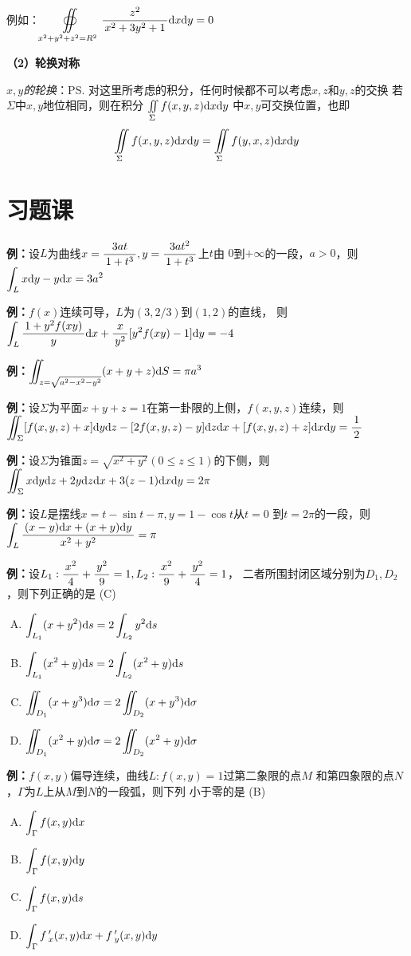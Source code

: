 例如：$\displaystyle\oiint\limits_{x^2+y^2+z^2=R^2}\displaystyle\frac{\,{z^2}\,}{\,{x^2+3y^2+1}\,}\mathrm{d} x\mathrm{d} y=0$

{\bf （2）轮换对称}

{\it\color{red} $x,y$的轮换}：\ps{\color{red}
对这里所考虑的积分，任何时候都不可以考虑$x,z$和$y,z$的交换}
{\color{red} 若$\Sigma$中$x,y$地位相同，则在积分
$\iint\limits_{\Sigma}f(x,y,z)\mathrm{d} x\mathrm{d} y$
中$x,y$可交换位置}，也即
$$\iint\limits_{\Sigma}f(x,y,z)\mathrm{d} x\mathrm{d} y=\iint\limits_{\Sigma}f(y, x,z)\mathrm{d} x\mathrm{d} y$$

\newpage

\section{习题课}

{\bf 例：}设$L$为曲线$x=\displaystyle\frac{\,{3at}\,}{\,{1+t^3}\,},y=\displaystyle\frac{\,{3at^2}\,}{\,{1+t^3}\,}$上$t$由
$0$到$+\infty$的一段，$a>0$，则$\displaystyle\int_Lx\mathrm{d} y-y\mathrm{d} x=3a^2$

{\bf 例：}$f(x)$连续可导，$L$为$(3,2/3)$到$(1,2)$的直线，
则$\displaystyle\int_L\displaystyle\frac{\,{1+y^2f(xy)}\,}{\,{y}\,}\mathrm{d} x+\displaystyle\frac{\,{x}\,}{\,{y^2}\,}[y^2f(xy)-1]\mathrm{d} y=-4$

{\bf 例：}$\displaystyle\iint_{z=\sqrt{a^2-x^2-y^2}}(x+y+z)\mathrm{d} S=\pi a^3$

{\bf 例：}设$\Sigma$为平面$x+y+z=1$在第一卦限的上侧，$f(x,y,z)$连续，则
$\displaystyle\iint_{\Sigma}[f(x,y,z)+x]\mathrm{d} y\mathrm{d} z-[2f(x,y,z)-y]\mathrm{d} z\mathrm{d} x+
[f(x,y,z)+z]\mathrm{d} x\mathrm{d} y=\displaystyle\frac{\,{1}\,}{\,{2}\,}$

{\bf 例：}设$\Sigma$为锥面$z=\sqrt{x^2+y^2}(0\leq z\leq 1)$的下侧，则
$\displaystyle\iint_{\Sigma}x\mathrm{d} y\mathrm{d} z+2y\mathrm{d} z\mathrm{d} x+3(z-1)\mathrm{d} x\mathrm{d} y=2\pi$

{\bf 例：}设$L$是摆线$x=t-\sin t-\pi,y=1-\cos t$从$t=0$
到$t=2\pi$的一段，则$\displaystyle\int_L\displaystyle\frac{\,{(x-y)\mathrm{d} x+(x+y)\mathrm{d} y}\,}{\,{x^2+y^2}\,}=\pi$

{\bf 例：}设$L_1:\displaystyle\frac{\,{x^2}\,}{\,{4}\,}+\displaystyle\frac{\,{y^2}\,}{\,{9}\,}=1,L_2:\displaystyle\frac{\,{x^2}\,}{\,{9}\,}+\displaystyle\frac{\,{y^2}\,}{\,{4}\,}=1$，
二者所围封闭区域分别为$D_1,D_2$，则下列正确的是\;
(C)
\begin{enumerate}[(A)]
  \item $\displaystyle\int_{L_1}(x+y^2)\mathrm{d} s=2\displaystyle\int_{L_2}y^2\mathrm{d} s$
  \item $\displaystyle\int_{L_1}(x^2+y)\mathrm{d} s=2\displaystyle\int_{L_2}(x^2+y)\mathrm{d} s$
  \item $\displaystyle\iint_{D_1}(x+y^3)\mathrm{d}\sigma=2\displaystyle\iint_{D_2}(x+y^3)\mathrm{d}\sigma$
  \item $\displaystyle\iint_{D_1}(x^2+y)\mathrm{d}\sigma=2\displaystyle\iint_{D_2}(x^2+y)\mathrm{d}\sigma$
\end{enumerate}

{\bf 例：}$f(x,y)$偏导连续，曲线$L:f(x,y)=1$过第二象限的点$M$
  和第四象限的点$N$，$\Gamma$为$L$上从$M$到$N$的一段弧，则下列
  小于零的是\;
(B)
  \begin{enumerate}[(A)]
  \setlength{\itemindent}{1cm}
    \item $\displaystyle\int_{\Gamma}f(x,y)\mathrm{d} x$
    \item $\displaystyle\int_{\Gamma}f(x,y)\mathrm{d} y$
    \item $\displaystyle\int_{\Gamma}f(x,y)\mathrm{d} s$
    \item $\displaystyle\int_{\Gamma}f\,'_x(x,y)\mathrm{d} x+f\,'_y(x,y)\mathrm{d} y$
  \end{enumerate}

